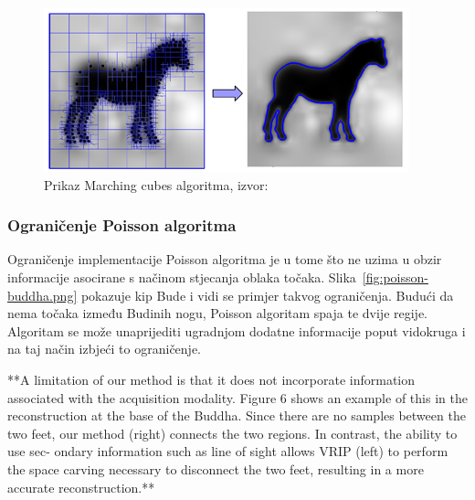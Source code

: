 \begin{figure}[h]
\centering
\includegraphics[scale=0.8]{figures/poisson-marching-cubes.png}
\caption[]{Prikaz Marching cubes algoritma, izvor:~\cite{Kazhdan:2007}}
\label{fig:poisson-marching-cubes.png}
\end{figure}


\subsubsection{Ograničenje Poisson algoritma} %
\label{ssub:Ograničenje Poisson algoritma}

Ograničenje implementacije Poisson algoritma je u tome što ne uzima u
obzir informacije asocirane s načinom stjecanja oblaka točaka.
Slika~\ref{fig:poisson-buddha.png} pokazuje kip Bude i vidi se primjer takvog
ograničenja. Budući da nema točaka između Budinih nogu, Poisson
algoritam spaja te dvije regije. Algoritam se može unaprijediti
ugradnjom dodatne informacije poput vidokruga i na taj način izbjeći to
ograničenje.

**A limitation of our method
is that it does not incorporate information associated with
the acquisition modality. Figure 6 shows an example of this
in the reconstruction at the base of the Buddha. Since there
are no samples between the two feet, our method (right)
connects the two regions. In contrast, the ability to use sec-
ondary information such as line of sight allows VRIP (left)
to perform the space carving necessary to disconnect the two
feet, resulting in a more accurate reconstruction.**


